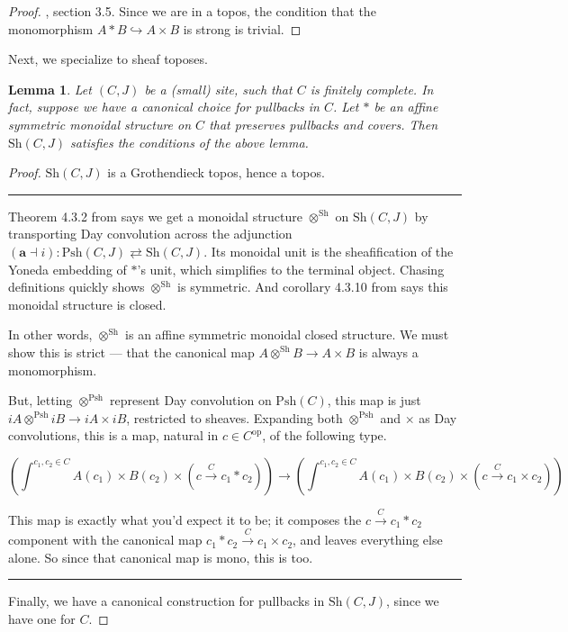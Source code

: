 \documentclass{article}
\newtheorem{lemma}[theorem]{Lemma}
\newcommand*{\Sh}{\mathrm{Sh}}
\newcommand*{\Psh}{\mathrm{Psh}}
\begin{document}
\begin{proof}
    \cite{schopp}, section 3.5. Since we are in a topos, the condition that the monomorphism \(A * B \hookrightarrow A \times B\) is strong is trivial.
\end{proof}

Next, we specialize to sheaf toposes.

\begin{lemma}
    Let \((C,J)\) be a (small) site, such that \(C\) is finitely complete.
    In fact, suppose we have a canonical choice for pullbacks in \(C\).
    Let \(*\) be an affine symmetric monoidal structure on \(C\) that preserves pullbacks and covers.
    Then \(\Sh(C,J)\) satisfies the conditions of the above lemma.
\end{lemma}

\begin{proof}
    \(\Sh(C,J)\) is a Grothendieck topos, hence a topos.

    \vspace*{1em}\hrule\vspace*{1em}

    Theorem 4.3.2 from \cite{biering} says we get a monoidal structure \(\otimes^\Sh\) on \(\Sh(C,J)\)
    by transporting Day convolution across the adjunction \((\mathbf{a} \dashv i) : \Psh(C,J) \rightleftarrows \Sh(C,J)\).
    Its monoidal unit is the sheafification of the Yoneda embedding of \(*\)'s unit, which simplifies to the terminal object.
    Chasing definitions quickly shows \(\otimes^\Sh\) is symmetric.
    And corollary 4.3.10 from \cite{biering} says this monoidal structure is closed.

    In other words, \(\otimes^\Sh\) is an affine symmetric monoidal closed structure.
    We must show this is strict --- that the canonical map \(A \otimes^\Sh B \to A \times B\) is always a monomorphism.

    But, letting \(\otimes^\Psh\) represent Day convolution on \(\Psh(C)\),
    this map is just \(iA \otimes^\Psh iB \to iA \times iB\), restricted to sheaves.
    Expanding both \(\otimes^\Psh\) and \(\times\) as Day convolutions,
    this is a map, natural in \(c \in C^\mathrm{op}\), of the following type.
    \begin{scriptsize}\[\left(\int^{c_1,c_2 \in C} A(c_1) \times B(c_2) \times (c \xrightarrow{C} c_1 * c_2)\right) \to \left(\int^{c_1,c_2 \in C} A(c_1) \times B(c_2) \times (c \xrightarrow{C} c_1 \times c_2)\right)\]\end{scriptsize}

    This map is exactly what you'd expect it to be; it composes the \(c \xrightarrow{C} c_1 * c_2\) component
    with the canonical map \(c_1 * c_2 \xrightarrow{C} c_1 \times c_2\), and leaves everything else alone.
    So since that canonical map is mono, this is too.

    \vspace*{1em}\hrule\vspace*{1em}

    Finally, we have a canonical construction for pullbacks in \(\Sh(C,J)\), since we have one for \(C\).
\end{proof}
\end{document}
